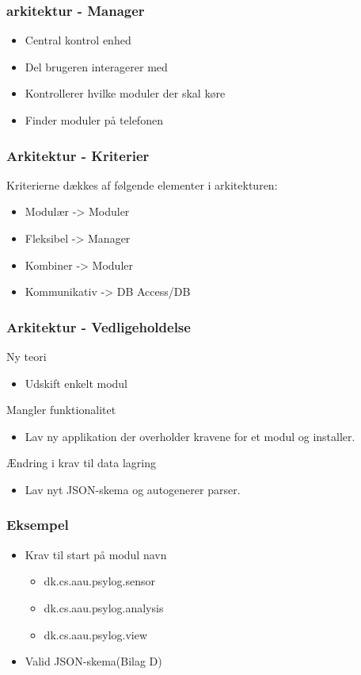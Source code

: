 \begin{frame}
\frametitle{arkitektur - Manager}
\begin{itemize}
\item Central kontrol enhed
\item Del brugeren interagerer med
\item Kontrollerer hvilke moduler der skal køre
\item Finder moduler på telefonen
\end{itemize}
\end{frame}

\begin{frame}
\frametitle{Arkitektur - Kriterier}
Kriterierne dækkes af følgende elementer i arkitekturen:
\begin{itemize}
\item Modulær -> Moduler
\item Fleksibel -> Manager
\item Kombiner -> Moduler
\item Kommunikativ -> DB Access/DB
\end{itemize}
\end{frame}

\begin{frame}
\frametitle{Arkitektur - Vedligeholdelse}
Ny teori
\begin{itemize}
\item Udskift enkelt modul
\end{itemize}
Mangler funktionalitet
\begin{itemize}
\item Lav ny applikation der overholder kravene for et modul og installer.
\end{itemize}
Ændring i krav til data lagring
\begin{itemize}
\item Lav nyt JSON-skema og autogenerer parser.
\end{itemize}

\end{frame}

\begin{frame}
\frametitle{Eksempel}
\begin{itemize}
\item Krav til start på modul navn
\begin{itemize}
\item dk.cs.aau.psylog.sensor
\item dk.cs.aau.psylog.analysis
\item dk.cs.aau.psylog.view
\end{itemize}
\item Valid JSON-skema(Bilag D)
\end{itemize}
\end{frame}

